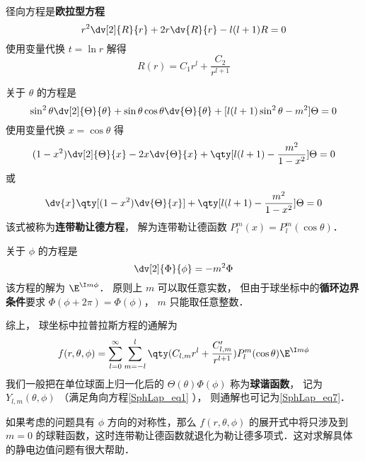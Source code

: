径向方程是\textbf{欧拉型方程}
\begin{equation}
r^2\dv[2]{R}{r} + 2r\dv{R}{r} - l(l+1)R = 0
\end{equation}
使用变量代换 $t = \ln r$ 解得
\begin{equation}
R(r) = C_1 r^l + \frac{C_2}{r^{l+1}}
\end{equation}

关于 $\theta$ 的方程是
\begin{equation}
\sin^2\theta \dv[2]{\Theta}{\theta} + \sin\theta\cos\theta\dv{\Theta}{\theta} + [l(l+1)\sin^2\theta - m^2] \Theta = 0
\end{equation}
使用变量代换 $x = \cos\theta$ 得
\begin{equation}
(1-x^2)\dv[2]{\Theta}{x} - 2x\dv{\Theta}{x} + \qty[l(l+1) - \frac{m^2}{1-x^2}]\Theta = 0
\end{equation}
或
\begin{equation}
\dv{x} \qty[(1-x^2)\dv{\Theta}{x}] + \qty[l(l+1) - \frac{m^2}{1-x^2}]\Theta = 0
\end{equation}
该式被称为\textbf{连带勒让德方程}， 解为连带勒让德函数 $P_l^m(x) = P_l^m(\cos\theta)$．

关于 $\phi$ 的方程是
\begin{equation}
\dv[2]{\Phi}{\phi} = -m^2 \Phi
\end{equation}
该方程的解为 $\E^{\I m\phi}$． 原则上 $m$ 可以取任意实数， 但由于球坐标中的\textbf{循环边界条件}要求 $\Phi(\phi + 2\pi) = \Phi(\phi)$， $m$ 只能取任意整数．

综上， 球坐标中拉普拉斯方程的通解为
\begin{equation}\label{SphLap_eq6}
f(r, \theta, \phi) = \sum_{l = 0}^\infty \sum_{m = -l}^l \qty(C_{l,m} r^l + \frac{C'_{l,m}}{r^{l+1}})P_l^m(\cos\theta)\E^{\I m\phi}
\end{equation}
我们一般把在单位球面上归一化后的 $\Theta(\theta)\Phi(\phi)$ 称为\textbf{球谐函数}， 记为 $Y_{l,m}(\theta,\phi)$ （满足角向方程\autoref{SphLap_eq1} ）， 则通解也可记为\autoref{SphLap_eq7}．

如果考虑的问题具有 $\phi$ 方向的对称性，那么 $f(r,\theta,\phi)$ 的展开式中将只涉及到 $m=0$ 的球鞋函数，这时连带勒让德函数就退化为勒让德多项式．这对求解具体的静电边值问题有很大帮助．